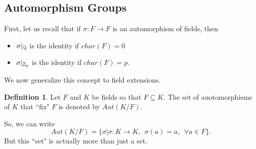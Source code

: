 \documentclass[12pt]{article}
\theoremstyle{plain}
\theoremstyle{definition}
\newtheorem{definition}{Definition}
\theoremstyle{remark}
\begin{document}
 \subsection{Automorphism Groups}
 First, let us recall that if $\sigma:F\rightarrow F$ is an automorphism of fields, then 
 \begin{itemize}
     \item $\sigma|_{\mathbb{Q}}$ is the identity if $char(F)=0$
     \item $\sigma|_{\mathbb{Z}_p}$ is the identity if $char(F)=p$. 
 \end{itemize}
We now generalize this concept to field extensions. 
\begin{definition}
Let $F$ and $K$ be fields so that $F\subseteq K$. The set of auotomorphisms of $K$ that ``fix" $F$ is denoted by $Aut(K/F)$. 
\end{definition}
So, we can write
$$Aut(K/F) = \{\sigma|\sigma :K\rightarrow K, \:\:\sigma(a)=a, \:\:\forall a\in F\}.$$
But this ``set" is actually more than just a set.
\end{document}
